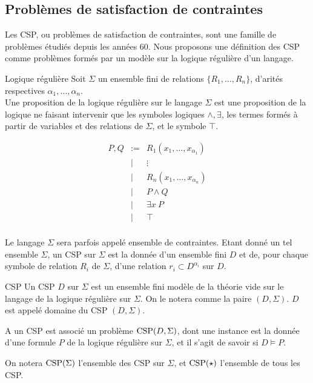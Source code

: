 \subsection{Problèmes de satisfaction de contraintes}

Les CSP, ou problèmes de satisfaction de contraintes, sont une famille de
problèmes étudiés depuis les années 60. Nous proposons une définition des CSP
comme problèmes formés par un modèle sur la logique régulière d'un langage.


\begin{defi}{Logique régulière}
    Soit $\Sigma$ un ensemble fini de relations $\{R_1,\dots,R_n\}$, d'arités
    respectives $\alpha_1,\dots,\alpha_n$.\\ Une proposition de la logique
    régulière sur le langage $\Sigma$ est une proposition de la logique ne
    faisant intervenir que les symboles logiques $\wedge, \exists$, les termes
    formés à partir de variables et des relations de $\Sigma$, et le symbole
    $\top$.

    \[\begin{array}{rcl}
    P,Q & := & R_1(x_1, \dots, x_{\alpha_1}) \\
    & |  & \vdots                        \\
    & |  & R_n(x_1, \dots, x_{\alpha_n}) \\
    & |  & P \wedge Q                    \\
    & |  & \exists x \ P                  \\
    & |  & \top                          \\
    \end{array}\]
\end{defi}

Le langage $\Sigma$ sera parfois appelé ensemble de contraintes. Etant donné un
tel ensemble $\Sigma$, un CSP sur $\Sigma$ est la donnée d'un ensemble fini $D$
et de, pour chaque symbole de relation $R_i$ de $\Sigma$, d'une relation $r_i
\subset D^{\alpha_i}$ sur $D$. 


\begin{defi}{CSP}
    Un CSP $D$ sur $\Sigma$ est un ensemble fini modèle de la théorie vide sur le
    langage de la logique régulière sur $\Sigma$. On le notera comme la paire
    $(D,\Sigma)$. $D$ est appelé domaine du CSP $(D,\Sigma)$.
    
    A un CSP est associé un problème $\text{CSP} (D,\Sigma)$, dont une instance est la
    donnée d'une formule $P$ de la logique régulière sur $\Sigma$, et il s'agit de
    savoir si $D \models P$.
    
    On notera $\text{CSP} (\Sigma)$ l'ensemble des CSP sur $\Sigma$, et $\text{CSP} (\star)$
    l'ensemble de tous les CSP.
\end{defi}

